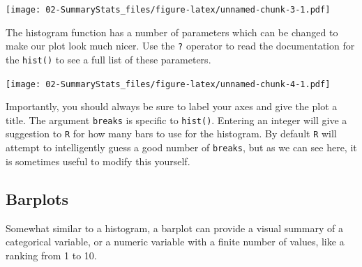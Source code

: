 \documentclass[]{book}
\newenvironment{Shaded}{\begin{snugshade}}{\end{snugshade}}
\newcommand{\KeywordTok}[1]{\textcolor[rgb]{0.13,0.29,0.53}{\textbf{#1}}}
\newcommand{\DataTypeTok}[1]{\textcolor[rgb]{0.13,0.29,0.53}{#1}}
\newcommand{\DecValTok}[1]{\textcolor[rgb]{0.00,0.00,0.81}{#1}}
\newcommand{\StringTok}[1]{\textcolor[rgb]{0.31,0.60,0.02}{#1}}
\newcommand{\CommentTok}[1]{\textcolor[rgb]{0.56,0.35,0.01}{\textit{#1}}}
\newcommand{\OperatorTok}[1]{\textcolor[rgb]{0.81,0.36,0.00}{\textbf{#1}}}
\newcommand{\NormalTok}[1]{#1}
\begin{document}
\begin{Shaded}
\end{Shaded}

\texttt{[image: 02-SummaryStats\_files/figure-latex/unnamed-chunk-3-1.pdf]}

The histogram function has a number of parameters which can be changed
to make our plot look much nicer. Use the \texttt{?} operator to read
the documentation for the \texttt{hist()} to see a full list of these
parameters.

\begin{Shaded}
\end{Shaded}

\texttt{[image: 02-SummaryStats\_files/figure-latex/unnamed-chunk-4-1.pdf]}

Importantly, you should always be sure to label your axes and give the
plot a title. The argument \texttt{breaks} is specific to
\texttt{hist()}. Entering an integer will give a suggestion to
\texttt{R} for how many bars to use for the histogram. By default
\texttt{R} will attempt to intelligently guess a good number of
\texttt{breaks}, but as we can see here, it is sometimes useful to
modify this yourself.

\subsection{Barplots}\label{barplots}

Somewhat similar to a histogram, a barplot can provide a visual summary
of a categorical variable, or a numeric variable with a finite number of
values, like a ranking from 1 to 10.

\begin{Shaded}
\end{Shaded}
\end{document}
